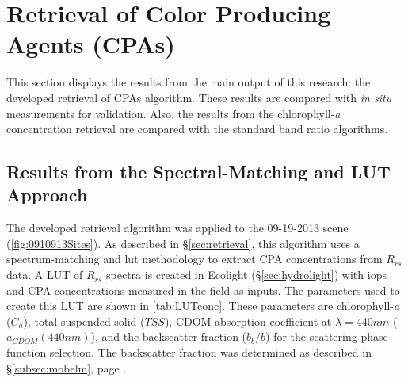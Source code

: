 \section{Retrieval of Color Producing Agents (CPAs)}
\label{sec:Results_CPAretrieval}
This section displays the results from the main output of this research: the developed retrieval of CPAs algorithm. These results are compared with {\it in situ} measurements for validation. Also, the results from the chlorophyll-{\it a} concentration retrieval are compared with the standard band ratio algorithms. 

\subsection{Results from the Spectral-Matching and LUT Approach}
\label{subsec:LUTapproach}
The developed retrieval algorithm \citep{Concha2013IGARSS} was applied to the 09-19-2013 scene (\autoref{fig:0910913Sites}). As described in \S\ref{sec:retrieval}, this algorithm uses a spectrum-matching and \gls{lut} methodology to extract CPA concentrations from $R_{rs}$ data. A LUT of $R_{rs}$ spectra is created in Ecolight (\S\ref{sec:hydrolight}) with \gls{iops} and CPA concentrations measured in the field as inputs. The parameters used to create this LUT are shown in \autoref{tab:LUTconc}. These parameters are chlorophyll-{\it a} ($C_a$), total suspended solid ($TSS$), CDOM absorption coefficient at $\lambda=440nm$ ($a_{CDOM}(440nm)$), and the backscatter fraction ($b_b/b$) for the scattering phase function selection. The backscatter fraction was determined as described in \S\ref{subsec:mobelm}, page \pageref{pag:phasefn}.

